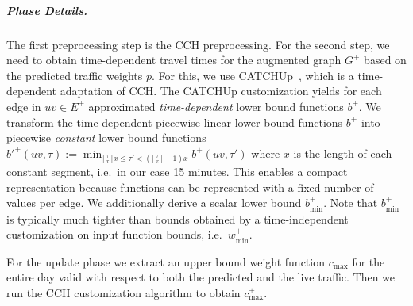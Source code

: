 \documentclass[a4paper,UKenglish,cleveref, autoref, thm-restate,anonymous]{lipics-v2021}
\newcommand*{\comb}{c}
\newcommand*{\pcfn}{\underline{b'^+}}
\newcommand*{\bucketlen}{x}
\begin{document}
\subparagraph{Phase Details.}
The first preprocessing step is the CCH preprocessing.
For the second step, we need to obtain time-dependent travel times for the augmented graph $G^+$ based on the predicted traffic weights $p$.
For this, we use CATCHUp~\cite{swz-sfert-21}, which is a time-dependent adaptation of CCH.
The CATCHUp customization yields for each edge in $uv \in E^+$ approximated \emph{time-dependent} lower bound functions $\underline{b^+}$.
We transform the time-dependent piecewise linear lower bound functions $\underline{b^+}$ into piecewise \emph{constant} lower bound functions
$\pcfn(uv, \tau) := \min_{\lfloor \frac{\tau}{\bucketlen} \rfloor \bucketlen \leq \tau' < (\lfloor \frac{\tau}{\bucketlen} \rfloor + 1) \bucketlen} \underline{b^+}(uv, \tau')$
where $\bucketlen$ is the length of each constant segment, i.e.\ in our case 15 minutes.
This enables a compact representation because functions can be represented with a fixed number of values per edge.
We additionally derive a scalar lower bound $b^+_{\min}$.
Note that $b^+_{\min}$ is typically much tighter than bounds obtained by a time-independent customization on input function bounds, i.e.\ $w^+_{\min}$.

For the update phase we extract an upper bound weight function $\comb_{\max}$ for the entire day valid with respect to both the predicted and the live traffic.
Then we run the CCH customization algorithm to obtain $\comb^+_{\max}$.
\end{document}

